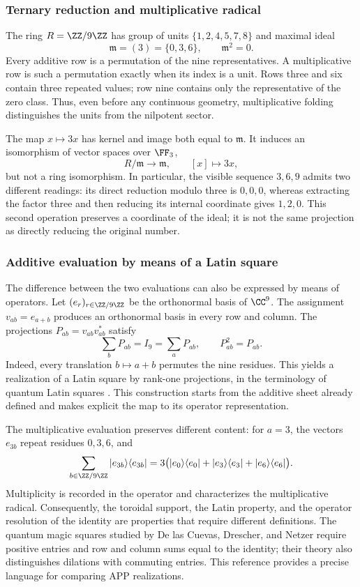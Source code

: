 \subsubsection{Ternary reduction and multiplicative radical}

The ring \(R=\ZZ/9\ZZ\) has group of units \(\{1,2,4,5,7,8\}\) and maximal ideal
\[
 \mathfrak m=(3)=\{0,3,6\},\qquad\mathfrak m^2=0.
\]
Every additive row is a permutation of the nine representatives. A multiplicative row is such a permutation exactly when its index is a unit. Rows three and six contain three repeated values; row nine contains only the representative of the zero class. Thus, even before any continuous geometry, multiplicative folding distinguishes the units from the nilpotent sector.

The map \(x\mapsto3x\) has kernel and image both equal to \(\mathfrak m\). It induces an isomorphism of vector spaces over \(\FF_3\),
\[
 R/\mathfrak m\longrightarrow\mathfrak m,\qquad [x]\longmapsto3x,
\]
but not a ring isomorphism. In particular, the visible sequence \(3,6,9\) admits two different readings: its direct reduction modulo three is \(0,0,0\), whereas extracting the factor three and then reducing its internal coordinate gives \(1,2,0\). This second operation preserves a coordinate of the ideal; it is not the same projection as directly reducing the original number.

\subsubsection{Additive evaluation by means of a Latin square}

The difference between the two evaluations can also be expressed by means of
operators. Let \((e_r)_{r\in\ZZ/9\ZZ}\) be the orthonormal basis of \(\CC^9\).
The assignment \(v_{ab}=e_{a+b}\) produces an orthonormal basis in every row
and column. The projections \(P_{ab}=v_{ab}v_{ab}^{*}\) satisfy
\[
 \sum_bP_{ab}=I_9=\sum_aP_{ab},\qquad P_{ab}^2=P_{ab}.
\]
Indeed, every translation \(b\mapsto a+b\) permutes the nine residues.
This yields a realization of a Latin square by rank-one projections,
in the terminology of quantum Latin squares
\cite{mustovicary,delascuevas2023}. This construction starts from the
additive sheet already defined and makes explicit the map to its operator representation.

The multiplicative evaluation preserves different content: for \(a=3\), the
vectors \(e_{3b}\) repeat residues \(0,3,6\), and
\[
 \sum_{b\in\ZZ/9\ZZ}|e_{3b}\rangle\langle e_{3b}|
 =3\bigl(|e_0\rangle\langle e_0|+|e_3\rangle\langle e_3|
                    +|e_6\rangle\langle e_6|\bigr).
\]
Multiplicity is recorded in the operator and characterizes the multiplicative
radical. Consequently, the toroidal support, the Latin property, and the
operator resolution of the identity are properties that require
different definitions. The quantum magic squares studied by
De las Cuevas, Drescher, and Netzer require positive entries and row and column
sums equal to the identity; their theory also distinguishes
dilations with commuting entries\cite{delascuevas2020}. This reference
provides a precise language for comparing APP realizations.

